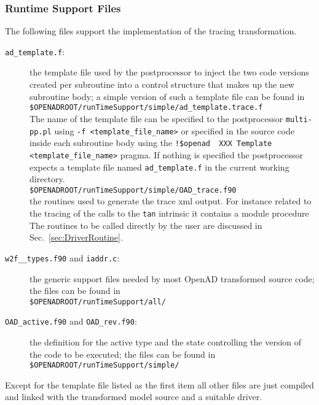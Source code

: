 \documentclass{article}
\newcommand{\refsec}[1]{{Sec.~\ref{#1}}}
\begin{document}
\subsubsection{Runtime Support Files}
The following files support the implementation of the tracing transformation.
\begin{description}
\item[{\tt ad\_template.f}:] the template file used by the postprocessor to inject the two code versions created per 
subroutine into a control structure that makes up the new subroutine body; a simple version of such a template file 
can be found in\\[1ex]   
\hspace*{1cm}\lstinline{$OPENADROOT/runTimeSupport/simple/ad_template.trace.f} \\[1ex]%
The name of the template file can be specified to the postprocessor \lstinline{multi-pp.pl} using
\lstinline{-f <template_file_name>} or specified in the source code inside each subroutine body using 
the \lstinline{!$openad  XXX Template <template_file_name>} %
pragma. If nothing is specified the postprocessor expects a template file named \lstinline{ad_template.f} in the 
current working directory.  \\[1ex]
\hspace*{1cm}\lstinline{$OPENADROOT/runTimeSupport/simple/OAD_trace.f90} \\[1ex]%
the routines used to generate the trace xml output. For instance related to the tracing of 
the calls to the \lstinline{tan} intrinsic it contains a module procedure\\[1ex]

The routines to be called directly by the user are discussed in \refsec{sec:DriverRoutine}.
\item[{\tt w2f\_\_types.f90} and {\tt iaddr.c}:] the generic support files needed by most OpenAD transformed source code;
the files can be found in \\[1ex]
\hspace*{1cm}\lstinline{$OPENADROOT/runTimeSupport/all/}%
\item[{\tt OAD\_active.f90} and {\tt OAD\_rev.f90}:] the definition for the active type and the state 
controlling the version of the code to be executed;
the files can be found in \\[1ex]
\hspace*{1cm}\lstinline{$OPENADROOT/runTimeSupport/simple/}%
\end{description}
Except for the template file listed as the first item all other files are just compiled and linked 
with the transformed model source and a suitable driver.
\end{document}
